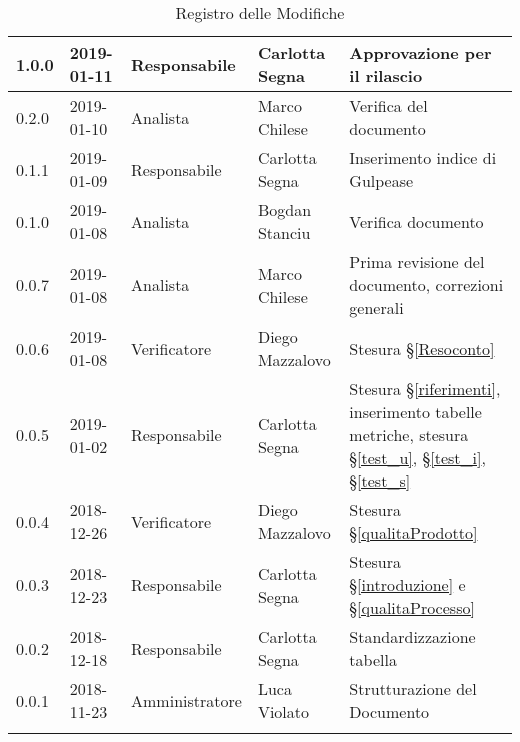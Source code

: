 \begin{center}
\begin{longtable}[c]{|m{}|m{}|m{}|m{}|p{}|}
\hline 
1.0.0 & 2019-01-11 & Responsabile & Carlotta Segna & Approvazione per il rilascio\\
\hline
\rowcolor{grigio}0.2.0 & 2019-01-10 & Analista & Marco Chilese & Verifica del documento\\
\hline
0.1.1 & 2019-01-09 & Responsabile & Carlotta Segna & Inserimento indice di Gulpease \\
\hline
\rowcolor{grigio}0.1.0 & 2019-01-08 &  Analista & Bogdan Stanciu & Verifica documento \\
\hline
0.0.7 & 2019-01-08 & Analista & Marco Chilese & Prima revisione del documento, correzioni generali\\
\hline
\rowcolor{grigio}0.0.6 & 2019-01-08 & Verificatore & Diego Mazzalovo & Stesura §\ref{Resoconto}\\
\hline
0.0.5 & 2019-01-02 & Responsabile & Carlotta Segna & Stesura §\ref{riferimenti}, inserimento tabelle metriche, stesura §\ref{test_u}, §\ref{test_i}, §\ref{test_s} \\
\hline
\rowcolor{grigio} 0.0.4 & 2018-12-26 & Verificatore & Diego Mazzalovo  & Stesura §\ref{qualitaProdotto} \\
\hline
0.0.3 & 2018-12-23 & Responsabile  & Carlotta Segna & Stesura §\ref{introduzione} e §\ref{qualitaProcesso} \\
\hline
\rowcolor{grigio} 0.0.2 & 2018-12-18 & Responsabile & Carlotta Segna & Standardizzazione tabella \\
\hline
0.0.1 & 2018-11-23 & Amministratore & Luca Violato & Strutturazione del Documento \\

\hline
\caption{Registro delle Modifiche}
\end{longtable}
\end{center}